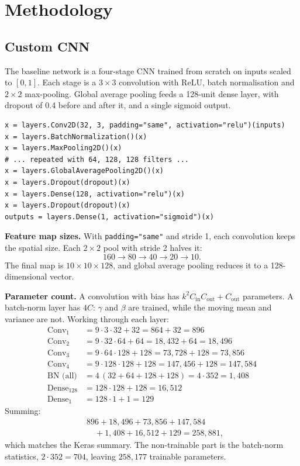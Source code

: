 \documentclass[conference]{IEEEtran}
\begin{document}
\section{Methodology}
\subsection{Custom CNN}
The baseline network is a four-stage CNN trained from scratch on inputs scaled to $[0,1]$. Each stage is a $3\times3$ convolution with ReLU, batch normalisation and $2\times2$ max-pooling. Global average pooling feeds a 128-unit dense layer, with dropout of 0.4 before and after it, and a single sigmoid output.

\begin{lstlisting}
x = layers.Conv2D(32, 3, padding="same", activation="relu")(inputs)
x = layers.BatchNormalization()(x)
x = layers.MaxPooling2D()(x)
# ... repeated with 64, 128, 128 filters ...
x = layers.GlobalAveragePooling2D()(x)
x = layers.Dropout(dropout)(x)
x = layers.Dense(128, activation="relu")(x)
x = layers.Dropout(dropout)(x)
outputs = layers.Dense(1, activation="sigmoid")(x)
\end{lstlisting}

\textbf{Feature map sizes.} With \texttt{padding="same"} and stride 1, each convolution keeps the spatial size. Each $2\times2$ pool with stride 2 halves it:
\[
160 \rightarrow 80 \rightarrow 40 \rightarrow 20 \rightarrow 10 .
\]
The final map is $10\times10\times128$, and global average pooling reduces it to a 128-dimensional vector.

\textbf{Parameter count.} A convolution with bias has $k^2 C_{\text{in}} C_{\text{out}} + C_{\text{out}}$ parameters. A batch-norm layer has $4C$: $\gamma$ and $\beta$ are trained, while the moving mean and variance are not. Working through each layer:
\begin{align*}
\text{Conv}_1 &= 9 \cdot 3 \cdot 32 + 32 = 864 + 32 = 896\\
\text{Conv}_2 &= 9 \cdot 32 \cdot 64 + 64 = 18{,}432 + 64 = 18{,}496\\
\text{Conv}_3 &= 9 \cdot 64 \cdot 128 + 128 = 73{,}728 + 128 = 73{,}856\\
\text{Conv}_4 &= 9 \cdot 128 \cdot 128 + 128 = 147{,}456 + 128 = 147{,}584\\
\text{BN (all)} &= 4\,(32 + 64 + 128 + 128) = 4 \cdot 352 = 1{,}408\\
\text{Dense}_{128} &= 128 \cdot 128 + 128 = 16{,}512\\
\text{Dense}_{1} &= 128 \cdot 1 + 1 = 129
\end{align*}
Summing:
\begin{align*}
&896 + 18{,}496 + 73{,}856 + 147{,}584\\
&\quad + 1{,}408 + 16{,}512 + 129 = 258{,}881,
\end{align*}
which matches the Keras summary. The non-trainable part is the batch-norm statistics, $2 \cdot 352 = 704$, leaving $258{,}177$ trainable parameters.
\end{document}
